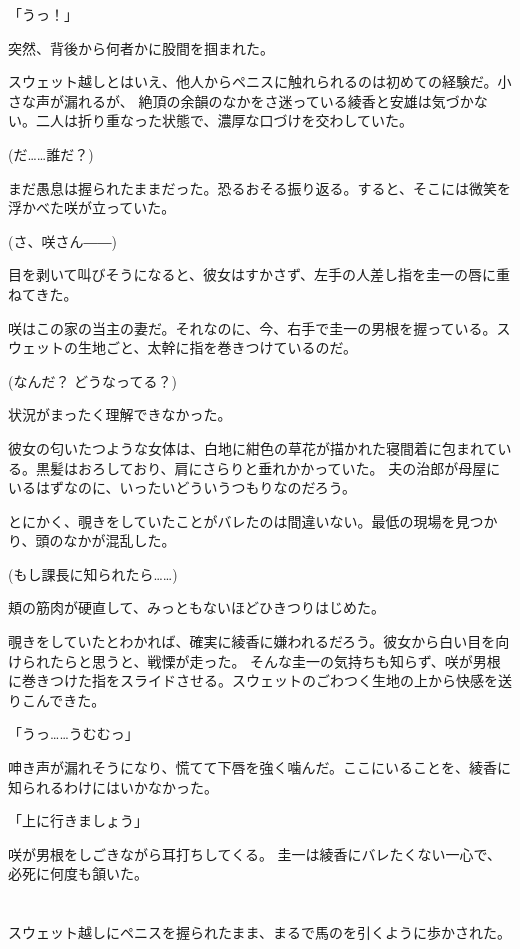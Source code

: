 ﻿\documentclass[
    book,tate,
    line_length=30zw,
    jafontsize=12pt,
    paper=b5j,
    landscape,
    ]{jlreq}
\begin{document}
「うっ！」

突然、背後から何者かに股間を掴まれた。

スウェット越しとはいえ、他人からペニスに触れられるのは初めての経験だ。小さな声が漏れるが、
絶頂の余韻のなかをさ迷っている綾香と安雄は気づかない。二人は折り重なった状態で、濃厚な口づけを交わしていた。

(だ……誰だ？)

まだ愚息は握られたままだった。恐るおそる振り返る。すると、そこには微笑を浮かべた咲が立っていた。

(さ、咲さん――)

目を剥いて叫びそうになると、彼女はすかさず、左手の人差し指を圭一の唇に重ねてきた。

咲はこの家の当主の妻だ。それなのに、今、右手で圭一の男根を握っている。スウェットの生地ごと、太幹に指を巻きつけているのだ。

(なんだ？ どうなってる？)

状況がまったく理解できなかった。

彼女の匂いたつような女体は、白地に紺色の草花が描かれた寝間着に包まれている。黒髪はおろしており、肩にさらりと垂れかかっていた。
夫の治郎が母屋にいるはずなのに、いったいどういうつもりなのだろう。

とにかく、覗きをしていたことがバレたのは間違いない。最低の現場を見つかり、頭のなかが混乱した。

(もし課長に知られたら……)

頬の筋肉が硬直して、みっともないほどひきつりはじめた。

覗きをしていたとわかれば、確実に綾香に嫌われるだろう。彼女から白い目を向けられたらと思うと、戦慄が走った。
そんな圭一の気持ちも知らず、咲が男根に巻きつけた指をスライドさせる。スウェットのごわつく生地の上から快感を送りこんできた。

「うっ……うむむっ」

呻き声が漏れそうになり、慌てて下唇を強く噛んだ。ここにいることを、綾香に知られるわけにはいかなかった。

「上に行きましょう」

咲が男根をしごきながら耳打ちしてくる。 圭一は綾香にバレたくない一心で、必死に何度も頷いた。

\section*{}

スウェット越しにペニスを握られたまま、まるで馬のを引くように歩かされた。
\end{document}
